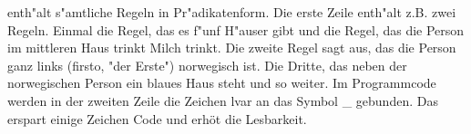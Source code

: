 enth"alt s"amtliche Regeln in Pr"adikatenform. Die erste Zeile enth"alt z.B. zwei Regeln. Einmal die Regel, das es f"unf H"auser gibt und die Regel, das die Person im mittleren Haus trinkt Milch trinkt. Die zweite Regel sagt aus, das die Person ganz links (firsto, "der Erste") norwegisch ist. Die Dritte, das neben der norwegischen Person ein blaues Haus steht und so weiter.
Im Programmcode werden in der zweiten Zeile die Zeichen \dq{}lvar\dq{} an das Symbol \dq{}\_\dq{} gebunden. Das erspart einige Zeichen Code und erhöt die Lesbarkeit.
